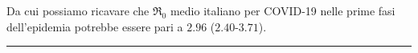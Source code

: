 \documentclass[11pt]{article}
\begin{document}
    Da cui possiamo ricavare che \(\Re_0\) medio italiano per COVID-19 nelle
prime fasi dell'epidemia potrebbe essere pari a \(2.96\)
(\(2.40\)-\(3.71\)).

    
    \begin{center}\rule{0.5\linewidth}{0.5pt}\end{center}


    
    



    
\end{document}
